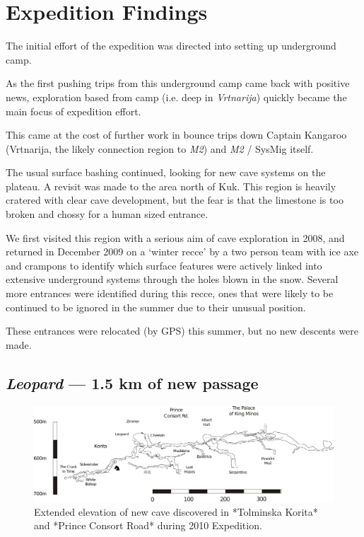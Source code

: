 
\section{Expedition Findings}

The initial effort of the expedition was directed into setting up
underground camp.

As the first pushing trips from this underground camp came back with
positive news, exploration based from camp (i.e. deep in
\emph{Vrtnarija}) quickly became the main focus of expedition effort.

This came at the cost of further work in bounce trips down Captain
Kangaroo (Vrtnarija, the likely connection region to \emph{M2}) and
\emph{M2} / SysMig itself.

The usual surface bashing continued, looking for new cave systems on the
plateau. A revisit was made to the area north of Kuk. This region is
heavily cratered with clear cave development, but the fear is that the
limestone is too broken and chossy for a human sized entrance.

We first visited this region with a serious aim of cave exploration in
2008, and returned in December 2009 on a `winter recce' by a two person
team with ice axe and crampons to identify which surface features were
actively linked into extensive underground systems through the holes
blown in the snow. Several more entrances were identified during this
recce, ones that were likely to be continued to be ignored in the summer
due to their unusual position.

These entrances were relocated (by GPS) this summer, but no new descents
were made.


\subsection{\texorpdfstring{\emph{Leopard} --- 1.5 km of new
passage}{Leopard --- 1.5 km of new passage}}

\begin{figure}
\centering
\includegraphics[width=0.9\columnwidth]{2010/expo_findings/2010_new_stuff_extended_extraction.pdf}
\caption{Extended elevation of new cave discovered in *Tolminska Korita* and *Prince
Consort Road* during 2010 Expedition.}
\end{figure}

